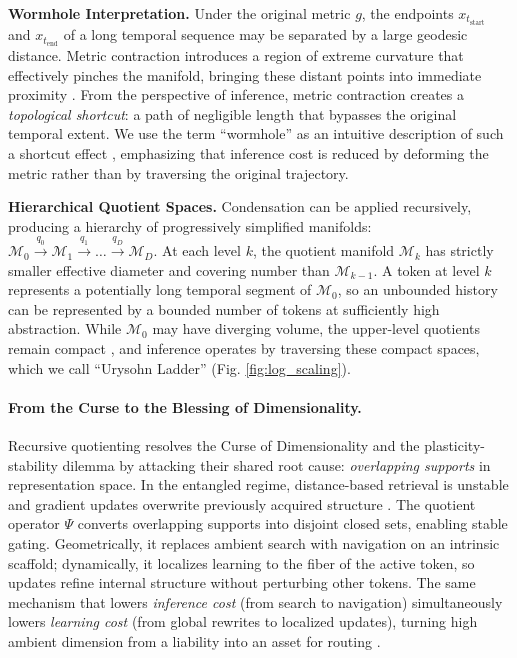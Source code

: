 \documentclass{article}
\begin{document}
\noindent\textbf{Wormhole Interpretation.}
Under the original metric $g$, the endpoints $x_{t_{\text{start}}}$ and $x_{t_{\text{end}}}$ of a long temporal sequence may be separated by a large geodesic distance.
Metric contraction introduces a region of extreme curvature that effectively pinches the manifold, bringing these distant points into immediate proximity \cite{gromov1999metric,memoli2007gromov}.
From the perspective of inference, metric contraction creates a \emph{topological shortcut}: a path of negligible length that bypasses the original temporal extent.
We use the term ``wormhole'' as an intuitive description of such a shortcut effect \cite{chung1997spectral,coifman2006diffusion}, emphasizing that inference cost is reduced by deforming the metric rather than by traversing the original trajectory.
 
\noindent\textbf{Hierarchical Quotient Spaces.}
Condensation can be applied recursively, producing a hierarchy of progressively simplified manifolds:
$\mathcal{M}_0 \xrightarrow{q_0} \mathcal{M}_1 \xrightarrow{q_1} \dots \xrightarrow{q_D} \mathcal{M}_D$.
At each level $k$, the quotient manifold $\mathcal{M}_k$ has strictly smaller effective diameter and covering number than $\mathcal{M}_{k-1}$.
A token at level $k$ represents a potentially long temporal segment of $\mathcal{M}_0$, so an unbounded history can be represented by a bounded number of tokens at sufficiently high abstraction.
While $\mathcal{M}_0$ may have diverging volume, the upper-level quotients remain compact \cite{burago2001course}, and inference operates by traversing these compact spaces, which we call ``Urysohn Ladder'' (Fig. \ref{fig:log_scaling}).
 
\paragraph{From the Curse to the Blessing of Dimensionality.}
Recursive quotienting resolves the Curse of Dimensionality and the plasticity-stability dilemma \cite{de2021continual} by attacking their shared root cause: \emph{overlapping supports} in representation space. In the entangled regime, distance-based retrieval is unstable and gradient updates overwrite previously acquired structure \cite{bengio2013representation}. The quotient operator $\Psi$ converts overlapping supports into disjoint closed sets, enabling stable gating. Geometrically, it replaces ambient search with navigation on an intrinsic scaffold; dynamically, it localizes learning to the fiber of the active token, so updates refine internal structure without perturbing other tokens. The same mechanism that lowers \emph{inference cost} (from search to navigation) simultaneously lowers \emph{learning cost} (from global rewrites to localized updates), turning high ambient dimension from a liability into an asset for routing \cite{mccloskey1989catastrophic}.
 
\end{document}
